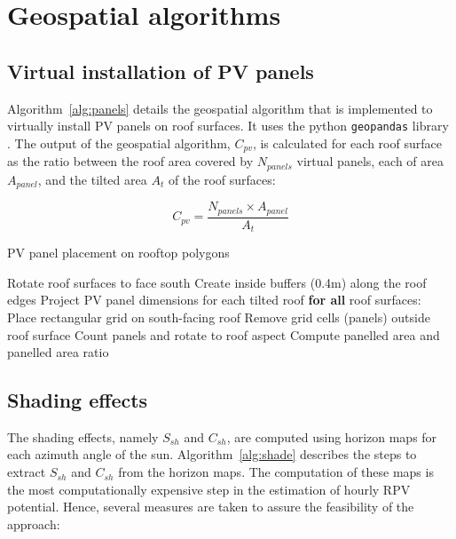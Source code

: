 
\section{Geospatial algorithms}

\subsection*{Virtual installation of PV panels}
\label{app:virtualPV}

Algorithm~\ref{alg:panels} details the geospatial algorithm that is implemented to virtually install PV panels on roof surfaces. It uses the python \texttt{geopandas} library \cite{kelsey_jordahl_geopandas/geopandas:_2019}. 
The output of the geospatial algorithm, $C_{\mathit{pv}}$, is calculated for each roof surface as the ratio between the roof area covered by $N_{\mathit{panels}}$ virtual panels, each of area $A_{\mathit{panel}}$, and the tilted area $A_{t}$ of the roof surfaces: 

\begin{equation}
\label{eq:cpv}
C_{\mathit{pv}} = \frac{N_{\mathit{panels}} \times A_{\mathit{panel}}}{A_t}
\end{equation}

\begin{algorithm}[htbp]
\caption{PV panel placement on rooftop polygons}
\label{alg:panels}
\begin{algorithmic}[1]
  \footnotesize
  \State Rotate roof surfaces to face south
  \State Create inside buffers (0.4m) along the roof edges
  \State Project PV panel dimensions for each tilted roof
  \Statex \textbf{for all} roof surfaces:
    \State \qquad Place rectangular grid on south-facing roof
    \State \qquad Remove grid cells (panels) outside roof surface
    \State \qquad Count panels and rotate to roof aspect
  \State Compute panelled area and panelled area ratio
\end{algorithmic}
\end{algorithm}

\subsection*{Shading effects}
\label{app:shade}

The shading effects, namely $S_{sh}$ and $C_{sh}$, are computed using horizon maps for each azimuth angle of the sun. Algorithm~\ref{alg:shade} describes the steps to extract $S_{sh}$ and $C_{sh}$ from the horizon maps.
The computation of these maps is the most computationally expensive step in the estimation of hourly RPV potential. Hence, several measures are taken to assure the feasibility of the approach:

